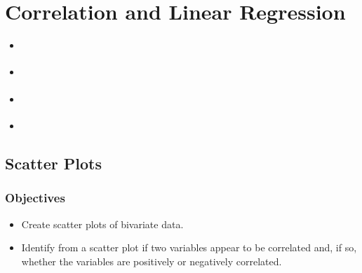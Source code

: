 \documentclass[letterpaper,10pt,english]{jupyterBook}
\begin{document}
\chapter{Correlation and Linear Regression}
\label{\detokenize{Ch8 Correlation and Linear Regression/8.0 Correlation and Linear Regression:correlation-and-linear-regression}}\label{\detokenize{Ch8 Correlation and Linear Regression/8.0 Correlation and Linear Regression::doc}}\begin{itemize}
\item {} 
\sphinxAtStartPar
{\hyperref[\detokenize{Ch8 Correlation and Linear Regression/8.1 Scatter Plots::doc}]{}}

\item {} 
\sphinxAtStartPar
{\hyperref[\detokenize{Ch8 Correlation and Linear Regression/8.2 Linear Equations::doc}]{}}

\item {} 
\sphinxAtStartPar
{\hyperref[\detokenize{Ch8 Correlation and Linear Regression/8.3 The Regression Equation::doc}]{}}

\item {} 
\sphinxAtStartPar
{\hyperref[\detokenize{Ch8 Correlation and Linear Regression/8.4 The Correlation Coefficient::doc}]{}}

\end{itemize}

\sphinxstepscope


\section{Scatter Plots}
\label{\detokenize{Ch8 Correlation and Linear Regression/8.1 Scatter Plots:scatter-plots}}\label{\detokenize{Ch8 Correlation and Linear Regression/8.1 Scatter Plots::doc}}

\subsection{Objectives}
\label{\detokenize{Ch8 Correlation and Linear Regression/8.1 Scatter Plots:objectives}}\begin{itemize}
\item {} 
\sphinxAtStartPar
Create scatter plots of bivariate data.

\item {} 
\sphinxAtStartPar
Identify from a scatter plot if two variables appear to be correlated and, if so, whether the variables are positively or negatively correlated.

\end{itemize}
\end{document}
